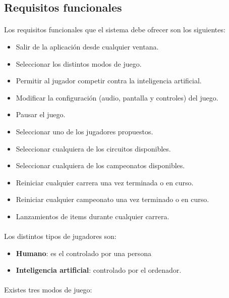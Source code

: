 \subsection{Requisitos funcionales}

\paragraph{}
Los requisitos funcionales que el sistema debe ofrecer son los siguientes:

\begin{itemize}
    \item Salir de la aplicación desde cualquier ventana.
    \item Seleccionar los distintos modos de juego.
    \item Permitir al jugador competir contra la inteligencia artificial.
    \item Modificar la configuración (audio, pantalla y controles) del juego.
    \item Pausar el juego.
    \item Seleccionar uno de los jugadores propuestos.
    \item Seleccionar cualquiera de los circuitos disponibles.
    \item Seleccionar cualquiera de los campeonatos disponibles.
    \item Reiniciar cualquier carrera una vez terminada o en curso.
    \item Reiniciar cualquier campeonato una vez terminado o en curso.
    \item Lanzamientos de items durante cualquier carrera.
\end{itemize}

\paragraph{}
Los distintos tipos de jugadores son:

\begin{itemize}
    \item \textbf{Humano}: es el controlado por una persona
    \item \textbf{Inteligencia artificial}: controlado por el ordenador.
\end{itemize}

\paragraph{}
Existes tres modos de juego:

